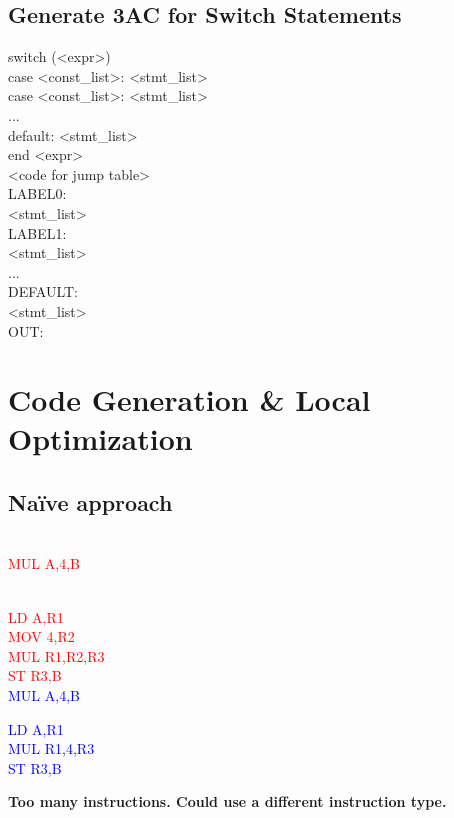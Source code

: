 \documentclass{report}
\newcommand{\textb}[1]{\textcolor{blue}{#1}}
\newcommand{\textr}[1]{\textcolor{red}{#1}}
\newlength\tindent
\renewcommand{\indent}{\hspace*{\tindent}}
\begin{document}
\section{Generate 3AC for Switch Statements}
\vspace{-1em}
\begin{multicols}{2}
switch (<expr>) \\
\indent case <const\_list>: <stmt\_list> \\
\indent case <const\_list>: <stmt\_list> \\
\indent ... \\
\indent default: <stmt\_list> \\
end
  \vfill\columnbreak
\indent <expr> \\
\indent <code for jump table> \\
LABEL0: \\
\indent <stmt\_list> \\
LABEL1: \\
\indent <stmt\_list> \\
\indent ... \\
DEFAULT: \\
\indent <stmt\_list> \\
OUT:
\end{multicols}


\setcounter{chapter}{6}
\chapter{Code Generation \& Local Optimization}
\section{Naïve approach}
\vspace{-1em}
\begin{multicols}{6}
 \ \\
\textr{MUL A,4,B} \\
\vfill\columnbreak
 \ \\
\vfill\columnbreak
\textr{LD A,R1} \\
\textr{MOV 4,R2} \\
\textr{MUL R1,R2,R3} \\
\textr{ST R3,B}
\vfill\columnbreak
 \ \\
\textb{MUL A,4,B}
\vfill\columnbreak
 \ \\
\vfill\columnbreak
\textb{LD A,R1} \\
\textb{MUL R1,4,R3} \\
\textb{ST R3,B}
\end{multicols}
\vspace{-1em}
\textbf{Too many instructions. Could use a different instruction type.} \\
\end{document}
